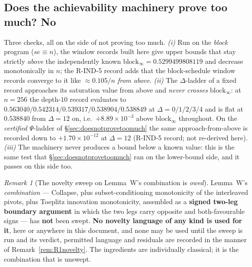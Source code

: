 \documentclass[11pt]{article}
\theoremstyle{definition}
\theoremstyle{remark}
\newtheorem{remark}{Remark}
\begin{document}
\subsection{Does the achievability machinery prove too much? No}
\label{sec:achievtoomuch}
Three checks, all on the side of not proving too much.
\emph{(i)} Run on the \emph{block} program ($se\equiv n$), the window records
built here give upper bounds that stay strictly \emph{above} the independently
known $\mathrm{block}_\infty=0.5299499808119$ and decrease monotonically in
$n$; the R-IND-5 record adds that the block-schedule window records converge to
it like $\approx0.105/n$ \emph{from above}.
\emph{(ii)} The $\Delta$-ladder of a fixed record approaches its saturation
value from above and \emph{never crosses} $\mathrm{block}_\infty$: at $n=256$
the depth-$10$ record evaluates to $0.563040/0.542314/0.539317/0.538904/
0.538849$ at $\Delta=0/1/2/3/4$ and is flat at $0.538840$ from $\Delta=12$
on, i.e.\ $+8.89\times10^{-3}$ above $\mathrm{block}_\infty$ throughout. On the
\emph{certified} $\Psi$-ladder of \S\ref{sec:doesnotprovetoomuch} the same
approach-from-above is recorded down to $+1.70\times10^{-12}$ at $\Delta=12$
(R-IND-5 record; not re-derived here).
\emph{(iii)} The machinery never produces a bound below a known value: this is
the same test that \S\ref{sec:doesnotprovetoomuch} ran on the lower-bound side,
and it passes on this side too.

\begin{remark}[The novelty sweep on Lemma~W's combination is \emph{owed}]
\label{rem:Wnovelty}
Lemma~W's \emph{combination} --- Collapse, plus subset-conditioning
monotonicity of the interleaved pivots, plus Toeplitz innovation monotonicity,
assembled as a \textbf{signed two-leg boundary argument} in which the two legs
carry opposite and both-favourable signs --- has \textbf{not} been swept.
\textbf{No novelty language of any kind is used for it}, here or anywhere in
this document, and none may be used until the sweep is run and its verdict,
permitted language and residuals are recorded in the manner of
Remark~\ref{rem:R1novelty}. The ingredients are individually classical; it is
the combination that is unswept.
\end{remark}
\end{document}
